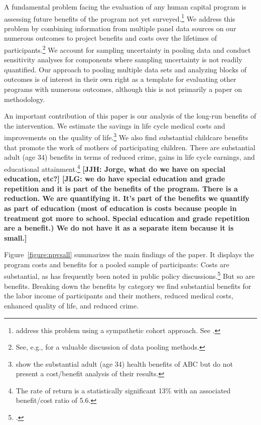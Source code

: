 A fundamental problem facing the evaluation of any human capital program is assessing future benefits of the program not yet surveyed.\footnote{\cite{Mincer_Polachek_1974_JPE} address this problem using a sympathetic cohort approach. See \cite{Heckman_Lochner_etal_2008_JHC}.} We address this problem by combining information from multiple panel data sources on our numerous outcomes to project benefits and costs over the lifetimes of participants.\footnote{See, e.g., \citealp{Ridder_Moffitt_2007_hbk_metricsdata} for a valuable discussion of data pooling methods.} We account for sampling uncertainty in pooling data and conduct sensitivity analyses for components where sampling uncertainty is not readily quantified. Our approach to pooling multiple data sets and analyzing blocks of outcomes is of interest in their own right as a template for evaluating other programs with numerous outcomes, although this is not primarily a paper on methodology.

An important contribution of this paper is our analysis of the long-run benefits of the intervention. We estimate the savings in life cycle medical costs and improvements on the quality of life.\footnote{\cite{Campbell_Conti_etal_2014_EarlyChildhoodInvestments} show the substantial adult (age 34) health benefits of ABC but do not present a cost/benefit analysis of their results.} We also find substantial childcare benefits that promote the work of mothers of participating children. There are substantial adult (age 34) benefits in terms of reduced crime, gains in life cycle earnings, and educational attainment.\footnote{The rate of return is a statistically significant 13\% with an associated benefit/cost ratio of 5.6.} \textbf{[JJH: Jorge, what do we have on special education, etc?] [JLG: we do have special education and grade repetition and it is part of the benefits of the program. There is a reduction. We are quantifying it. It's part of the benefits we quantify as part of education (most of education is costs because people in treatment got more to school. Special education and grade repetition are a benefit.) We do not have it as a separate item because it is small.]}

Figure~\ref{figure:npvsall} summarizes the main findings of the paper. It displays the program costs and benefits for a pooled sample of participants: Costs are substantial, as has frequently been noted in public policy discussions.\footnote{\cite{Whitehurst_2014_Senate_Testimony}.} But so are benefits. Breaking down the benefits by category we find substantial benefits for the labor income of participants and their mothers, reduced medical costs, enhanced quality of life, and reduced crime.

